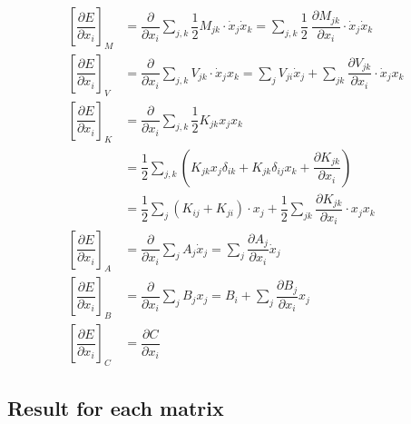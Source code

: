 \documentclass[a4paper]{article}
\begin{document}
 
\begin{align*} 
\left[ \dfrac{\partial E}{\partial x_{i}}\right]_{M} & = \dfrac{\partial}{\partial x_{i}} \sum_{j,  k} \dfrac{1}{2}M_{jk} \cdot \dot{x}_{j} \dot{x}_{k} = \sum_{j, k} \dfrac{1}{2} \ \dfrac{\partial M_{jk}}{\partial x_{i}} \cdot \dot{x}_{j} \dot{x}_{k}  \\
\left[ \dfrac{\partial E}{\partial x_{i}}\right]_{V} & = \dfrac{\partial}{\partial x_{i}} \sum_{j, k} V_{jk} \cdot \dot{x}_{j} x_{k} = \sum_{j} V_{ji} \dot{x}_{j} + \sum_{jk} \dfrac{\partial V_{jk}}{\partial x_{i}} \cdot \dot{x}_{j} x_{k} \\ %
\left[ \dfrac{\partial E}{\partial x_{i}}\right]_{K} & = \dfrac{\partial}{\partial x_{i}} \sum_{j, k} \dfrac{1}{2}K_{jk} x_{j} x_{k} \\ 
& = \dfrac{1}{2}\sum_{j, k} \left(K_{jk}x_{j} \delta_{ik} + K_{jk} \delta_{ij} x_{k} + \dfrac{\partial K_{jk}}{\partial x_{i}}\right) \\ 
& = \dfrac{1}{2} \sum_{j}\left(K_{ij} + K_{ji}\right) \cdot x_{j} + \dfrac{1}{2}\sum_{jk} \dfrac{\partial K_{jk}}{\partial x_{i}} \cdot x_{j}x_{k} \\
\left[\dfrac{\partial E}{\partial x_{i}}\right]_{A} & = \dfrac{\partial}{\partial x_{i}} \sum_{j} A_{j} \dot{x}_{j} = \sum_{j} \dfrac{\partial A_{j}}{\partial x_{i}} \dot{x}_{j} \\
\left[\dfrac{\partial E}{\partial x_{i}}\right]_{B} & = \dfrac{\partial}{\partial x_{i}} \sum_{j} B_{j} x_{j}  = B_{i} + \sum_{j} \dfrac{\partial B_{j}}{\partial x_{i}} x_{j} \\
\left[\dfrac{\partial E}{\partial x_{i}}\right]_{C} & = \dfrac{\partial C}{\partial x_{i}}  
\end{align*} 
 

\subsection{Result for each matrix}
\end{document}
